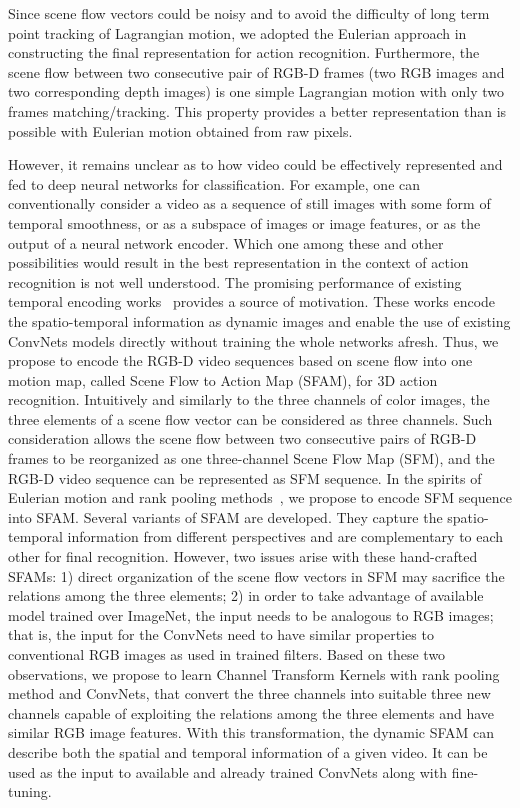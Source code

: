 \documentclass[10pt,twocolumn,letterpaper]{article}
\begin{document}
Since scene flow vectors could be noisy and to avoid the difficulty of long 
term point tracking of Lagrangian motion, we adopted the Eulerian approach in 
constructing the final representation for action recognition. Furthermore, the 
scene flow between two consecutive pair of RGB-D frames (two RGB images and two 
corresponding depth images) is one simple Lagrangian motion with only two 
frames matching/tracking. This property provides a better representation than 
is possible with Eulerian motion obtained from raw pixels. 


However, it remains unclear as to how video could be effectively represented 
and fed to deep neural networks for classification. For example, one can 
conventionally consider a video as a sequence of still images with some form of 
temporal smoothness, or as a subspace of images or image features, or as the 
output of a neural network encoder. Which one among these and other 
possibilities would result in the best representation in the context of action 
recognition is not well understood. The promising performance of existing 
temporal encoding 
works~\cite{pichao2015,pichaoTHMS,pichao2016,bilen2016dynamic} provides a 
source of motivation. These works encode the spatio-temporal information as 
dynamic images and enable the use of existing ConvNets models directly without 
training the whole networks afresh. Thus, we propose to encode the RGB-D video 
sequences based on scene flow into one motion map, called Scene Flow to Action 
Map (SFAM), for 3D action recognition. Intuitively and similarly to the three 
channels of color images, the three elements of a scene flow vector can be 
considered as three channels. Such consideration allows the scene flow between 
two consecutive pairs of RGB-D frames to be reorganized as one three-channel 
Scene Flow Map (SFM), and the RGB-D video sequence can be represented as SFM 
sequence.  In the spirits of Eulerian motion and rank pooling 
methods~\cite{fernando2016rank,bilen2016dynamic}, we propose to encode SFM 
sequence into SFAM.  Several variants of SFAM are developed. They capture the 
spatio-temporal information from different perspectives and are complementary 
to each other for final recognition.  However, two issues arise with these 
hand-crafted SFAMs: 1) direct organization of the scene flow vectors in SFM may 
sacrifice the relations among the three elements; 2) in order to take 
advantage of available model trained over ImageNet, the input needs to be 
analogous to RGB images; that is, the input for the ConvNets need to have 
similar properties to conventional RGB images as used in trained 
filters. Based on these two observations, we propose to learn Channel Transform 
Kernels  with  rank pooling method and ConvNets, that convert the 
three channels into suitable three new  channels capable of exploiting the 
relations among the three elements and have similar RGB image features.  
With this transformation, the dynamic SFAM can describe both 
the spatial and temporal information of a given video. It can be used as the 
input to available and already trained ConvNets along with fine-tuning.
\end{document}
